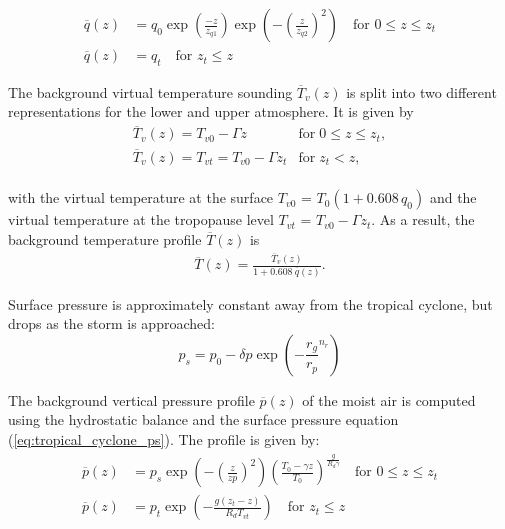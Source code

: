 \documentclass[times,doublespace]{fldauth}
\begin{document}
\begin{equation}
\begin{split}
\overline{q}(z)&=q_0 \exp\left(\frac{-z}{z_{q1}}\right)\exp\left(-\left(\frac{z}{z_{q2}}\right)^2\right) \text{ ~~for   } 0 \leq z \leq z_t \\
\overline{q}(z)&=q_t  \text{ ~~for   }  z_t \leq z
\end{split}
\end{equation}

The background virtual temperature sounding $\overline{T}_v(z)$ is split into two different representations for the lower and upper atmosphere.  It is given by
\begin{equation}
\begin{array}{ll} \label{eq2}
\overline{T}_v(z) = T_{v0} - \Gamma z & \mbox{for} \; 0 \le z \le z_t, \\
\overline{T}_v(z) = T_{vt} = T_{v0} - \Gamma z_t & \mbox{for} \; z_t < z, 
\end{array}
\end{equation}
~\\with the virtual temperature at the surface $T_{v0}$ = $T_0 (1+0.608 \, q_0)$ and the virtual temperature at the tropopause level $T_{vt}$ = $T_{v0} - \Gamma z_t$.  As a result, the background temperature profile $\overline{T}(z)$ is
\begin{eqnarray} \label{eq3}
\overline{T}(z) = \frac{\overline{T}_v(z)}{1 + 0.608\ \overline{q}(z)}.
\end{eqnarray}


Surface pressure is approximately constant away from the tropical cyclone, but drops as the storm is approached:
\begin{equation}
p_s=p_0 - \delta p \exp\left(-\frac{r_g}{r_p}^{n_r}\right)
\label{eq:tropical_cyclone_ps}
\end{equation}

The background vertical pressure profile $\overline{p}(z)$ of the moist air is computed using the hydrostatic balance and the surface pressure equation (\ref{eq:tropical_cyclone_ps}). The profile is given by:
\begin{equation}
\begin{split}
\overline{p}(z)&=p_s \exp\left(-\left(\frac{z}{zp}\right)^{2}\right)\left(\frac{T_0-\gamma z}{T_0}\right)^{\frac{g}{R_d\gamma}} \text{ ~~for   } 0 \leq z \leq z_t \\
\overline{p}(z)&=p_t \exp\left(-\frac{g(z_t-z)}{R_dT_{vt}}\right) \text{ ~~for   }  z_t \leq z
\end{split}
\end{equation}
\end{document}
